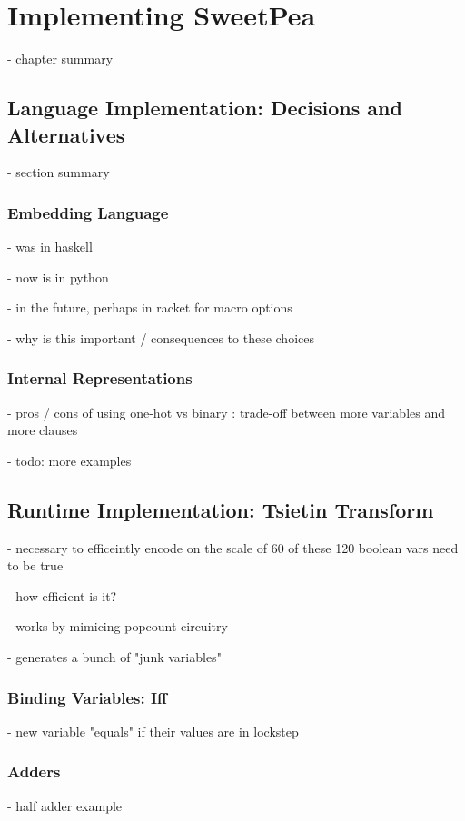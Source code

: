 
\chapter{Implementing SweetPea}

- chapter summary

\section{Language Implementation: Decisions and Alternatives}

- section summary

\subsection{Embedding Language}

- was in haskell

- now is in python

- in the future, perhaps in racket for macro options

- why is this important / consequences to these choices

\subsection{Internal Representations}

- pros / cons of using one-hot vs binary : trade-off between more variables and more clauses

- todo: more examples

\section{Runtime Implementation: Tsietin Transform}
- necessary to efficeintly encode on the scale of 60 of these 120 boolean vars need to be true

- how efficient is it?

- works by mimicing popcount circuitry

- generates a bunch of "junk variables"

\subsection{Binding Variables: Iff}
- new variable "equals" if their values are in lockstep

\subsection{Adders}
- half adder example

